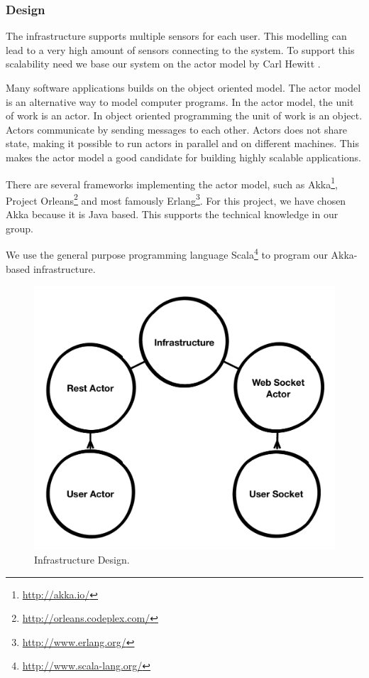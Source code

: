 \documentclass{sigchi}
\begin{document}
\subsubsection{Design}
The infrastructure supports multiple sensors for each user.
This modelling can lead to a very high amount of sensors connecting to the system.
To support this scalability need we base our system on the actor model by Carl Hewitt \cite{hewitt1973universal}.

Many software applications builds on the object oriented model.
The actor model is an alternative way to model computer programs.
In the actor model, the unit of work is an actor.
In object oriented programming the unit of work is an object.
Actors communicate by sending messages to each other.
Actors does not share state, making it possible to run actors in parallel and on different machines.
This makes the actor model a good candidate for building highly scalable applications.

There are several frameworks implementing the actor model, such as Akka\footnote{\url{http://akka.io/}}, Project Orleans\footnote{\url{http://orleans.codeplex.com/}} and most famously Erlang\footnote{\url{http://www.erlang.org/}}.
For this project, we have chosen Akka because it is Java based.
This supports the technical knowledge in our group.

We use the general purpose programming language Scala\footnote{\url{http://www.scala-lang.org/}} to program our Akka-based infrastructure.


\begin{figure}[H]
  \centering
  \includegraphics[width=\columnwidth]{figures/infrastructure_design.pdf}
  \caption{Infrastructure Design.}
  \label{fig:infrastructure}
\end{figure}
\end{document}
